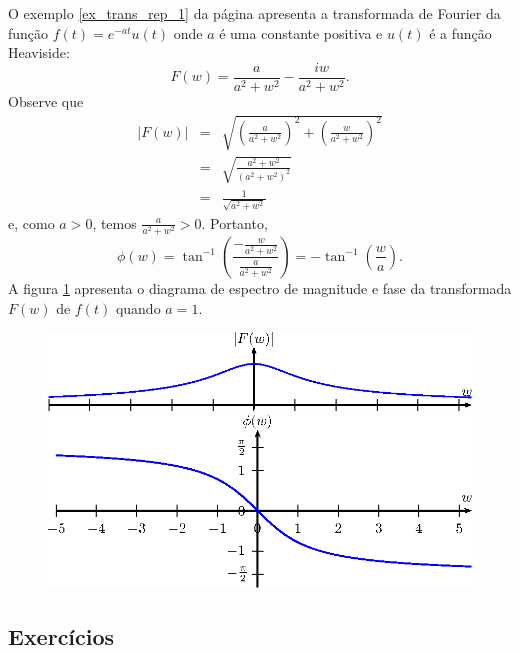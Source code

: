 \begin{ex} O exemplo \ref{ex_trans_rep_1} da página \pageref{ex_trans_rep_1} apresenta a transformada de Fourier da função $f(t)=e^{-at}u(t)$ onde $a$ é uma constante positiva e $u(t)$ é a função Heaviside: 
\begin{equation*}
F(w)=\frac{a}{a^2+w^2}-\frac{iw}{a^2+w^2}.
\end{equation*}
Observe que
\begin{eqnarray*}
|F(w)|&=&\sqrt{\left(\frac{a}{a^2+w^2}\right)^2+\left(\frac{w}{a^2+w^2}\right)^2}\\
&=&\sqrt{\frac{a^2+w^2}{\left(a^2+w^2\right)^2}}\\&=&\frac{1}{\sqrt{a^2+w^2}}
\end{eqnarray*}
e, como $a>0$, temos $\frac{a}{a^2+w^2}>0$. Portanto,
\begin{equation}
\phi(w)=\tan^{-1}\left(\frac{-\frac{w}{a^2+w^2}}{\frac{a}{a^2+w^2}}\right)=-\tan^{-1}\left(\frac{w}{a}\right).
\end{equation}
A figura \ref{diag_espec_trans_2} apresenta o diagrama de espectro de magnitude e fase da transformada $F(w)$ de $f(t)$ quando $a=1$.
\begin{figure}[!ht]
\begin{center}
\includegraphics[width=\textwidth]{cap_diagramas_espectro_transformada/pics/figura_2}\vspace{30pt}
\includegraphics[width=\textwidth]{cap_diagramas_espectro_transformada/pics/figura_3}\end{center}
\caption{\label{diag_espec_trans_2}}
\end{figure}
\end{ex}
\subsection*{Exercícios}

